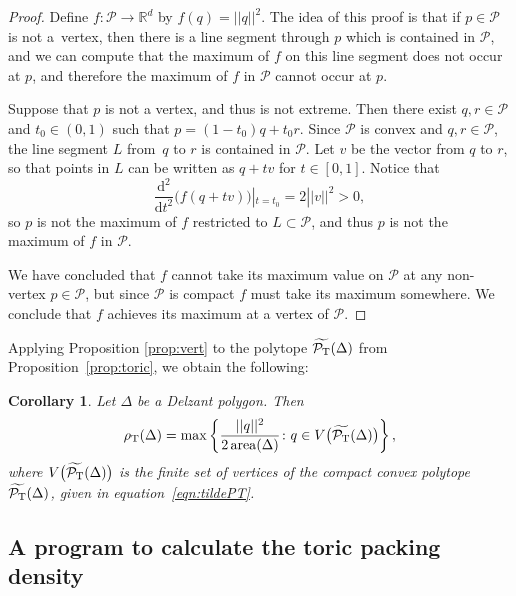 \documentclass[10pt,a4paper]{amsart}
\numberwithin{equation}{section}
\newtheorem{Corollary}[Theorem]{Corollary}
\def\R{{\mathbb R}}
\newcommand{\De}{\Delta}
\newcommand{\area}{\operatorname{area}}
\newcommand{\PT}{\mathcal{P}_{\rm T}}
\newcommand{\PTtilde}{\widetilde{\PT}}
\theoremstyle{definition}
\theoremstyle{plain}
\theoremstyle{plain}
\begin{document}
\begin{proof}
 Define $f\colon \mathcal{P}\to \R^d$ by $f(q) = ||q||^2$.
 The idea of this proof is that if $p\in\mathcal{P}$ is not a~vertex, then there is a line segment through $p$ which is contained in $\mathcal{P}$, and we can compute that the maximum of $f$ on this line segment does not occur at $p$, and therefore the maximum of $f$ in $\mathcal{P}$ cannot occur at $p$.

 Suppose that $p$ is not a vertex, and thus is not extreme. Then
 there exist $q,r \in \mathcal{P}$ and $t_0 \in (0,1)$ such that $p = (1-t_0)q +t_0r$. Since $\mathcal{P}$ is convex and $q,r \in \mathcal{P}$, the line segment $L$ from~$q$ to $r$ is contained in $\mathcal{P}$.
 Let $v$ be the vector from $q$ to $r$, so that points in $L$ can be written as $q+tv$ for $t\in[0,1]$.
 Notice that
 \[
 \frac{\mathrm{d}^2}{\mathrm{d}t^2}\big( f(q+tv)\big)|_{t=t_0} = 2||v||^2>0,
\]
 so $p$ is not the maximum of $f$ restricted to $L\subset \mathcal{P}$, and thus $p$ is not the maximum of $f$ in $\mathcal{P}$.




 We have concluded that $f$ cannot take its maximum value on $\mathcal{P}$ at any non-vertex $p\in\mathcal{P}$, but since $\mathcal{P}$ is compact $f$ must take its maximum somewhere. We conclude that $f$ achieves its maximum at a vertex of $\mathcal{P}$.
 \end{proof}


Applying Proposition \ref{prop:vert} to the polytope
$\PTtilde(\Delta)$ from Proposition~\ref{prop:toric},
we obtain the following:
\begin{Corollary}
 \label{cor:toric-vertex}
 Let $\De$ be a Delzant polygon.
 Then
 \[
 \rho_{{\rm T}} (\De) = \max \left\{ \frac{||q||^2}{2 \area(\De)}\colon  q\in V\big(\PTtilde(\De)\big)\right\},
 \]
 where $V\big(\PTtilde(\De)\big)$ is the finite set of vertices of the compact convex polytope $\PTtilde(\De)$, given in equation~\eqref{eqn:tildePT}.
 \end{Corollary}


 \subsection{A program to calculate the toric packing density}
\label{sec:program}
\end{document}
